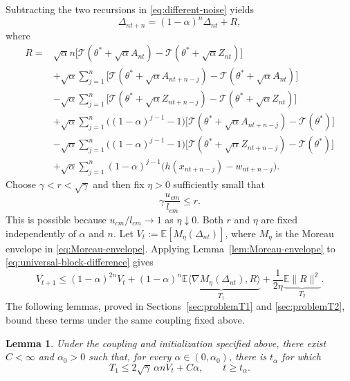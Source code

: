 \documentclass[11pt,letterpaper]{article}
\theoremstyle{plain}
\newtheorem{lemma}{Lemma}
\theoremstyle{definition}
\theoremstyle{remark}
\newcommand{\E}{\mathbb{E}}
\newcommand{\mT}{\mathcal{T}}
\begin{document}
Subtracting the two recursions in \eqref{eq:different-noise} yields
\begin{equation}
\label{eq:universal-block-difference}
    \Delta_{nt+n}=(1-\alpha)^n\Delta_{nt}+R,
\end{equation}
where
\begin{align*}
R={}&\sqrt\alpha n
    \bigl[\mT(\theta^*+\sqrt\alpha A_{nt})
          -\mT(\theta^*+\sqrt\alpha Z_{nt})\bigr]\\
&+\sqrt\alpha\sum_{j=1}^n
    \bigl[\mT(\theta^*+\sqrt\alpha A_{nt+n-j})
          -\mT(\theta^*+\sqrt\alpha A_{nt})\bigr]\\
&-\sqrt\alpha\sum_{j=1}^n
    \bigl[\mT(\theta^*+\sqrt\alpha Z_{nt+n-j})
          -\mT(\theta^*+\sqrt\alpha Z_{nt})\bigr]\\
&+\sqrt\alpha\sum_{j=1}^n\bigl((1-\alpha)^{j-1}-1\bigr)
    \bigl[\mT(\theta^*+\sqrt\alpha A_{nt+n-j})-\mT(\theta^*)\bigr]\\
&-\sqrt\alpha\sum_{j=1}^n\bigl((1-\alpha)^{j-1}-1\bigr)
    \bigl[\mT(\theta^*+\sqrt\alpha Z_{nt+n-j})-\mT(\theta^*)\bigr]\\
&+\sqrt\alpha\sum_{j=1}^n(1-\alpha)^{j-1}
    \bigl(h(x_{nt+n-j})-w_{nt+n-j}\bigr).
\end{align*}
Choose \(\gamma<r<\sqrt\gamma\) and then fix \(\eta>0\) sufficiently
small that
\begin{equation}
\label{eq:universal-contraction-margin}
    \gamma\frac{u_{cm}}{l_{cm}}\leq r.
\end{equation}
This is possible because \(u_{cm}/l_{cm}\to1\) as \(\eta\downarrow0\).
Both \(r\) and \(\eta\) are fixed independently of \(\alpha\) and \(n\).
Let \(V_t:=\E[M_\eta(\Delta_{nt})]\), where \(M_\eta\) is the Moreau
envelope in \eqref{eq:Moreau-envelope}. Applying
Lemma~\ref{lem:Moreau-envelope} to
\eqref{eq:universal-block-difference} gives
\begin{equation}\label{eq:maininduction1}
    V_{t+1}
    \leq (1-\alpha)^{2n}V_t
    +(1-\alpha)^n
        \underbrace{\E\langle\nabla M_\eta(\Delta_{nt}),R\rangle}_{T_1}
    +\frac1{2\eta}\underbrace{\E\|R\|^2}_{T_2}.
\end{equation}
The following lemmas, proved in Sections~\ref{sec:problemT1} and
\ref{sec:problemT2}, bound these terms under the same coupling fixed above.

\begin{lemma}
\label{lem:SSCT1}
Under the coupling and initialization specified above, there exist
\(C<\infty\) and \(\alpha_0>0\) such that, for every
\(\alpha\in(0,\alpha_0)\), there is \(t_\alpha\) for which
\[
    T_1\leq2\sqrt\gamma\,\alpha n V_t+C\alpha,
    \qquad t\geq t_\alpha.
\]
\end{lemma}
\end{document}
